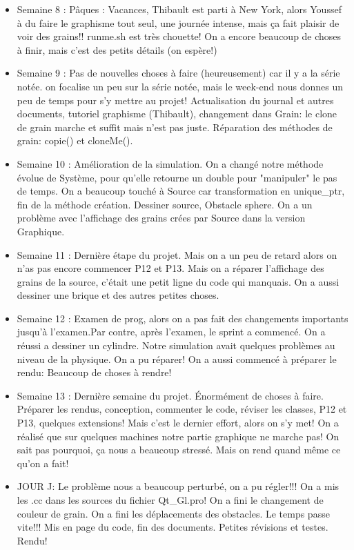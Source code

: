 \documentclass[a4paper,10pt]{article}
\begin{document}
\begin{itemize}
 \item Semaine 8 : Pâques : Vacances, Thibault est parti à New York, alors Youssef à du faire le graphisme tout seul, une journée intense, mais ça fait plaisir de voir des grains!! runme.sh est très chouette! On a encore beaucoup de choses à finir, mais c'est des petits détails (on espère!)
 
 \item Semaine 9 : Pas de nouvelles choses à faire (heureusement) car il y a la série notée. on focalise un peu sur la série notée, mais le week-end nous donnes un peu de temps pour s'y mettre au projet! Actualisation du journal et autres documents, tutoriel graphisme (Thibault), changement dans Grain: le clone de grain marche et suffit mais n'est pas juste. Réparation des méthodes de grain: copie() et cloneMe().
 
 \item Semaine 10 : Amélioration de la simulation. On a changé notre méthode évolue de Système, pour qu'elle retourne un double pour "manipuler" le pas de temps. On a beaucoup touché à Source car transformation en unique\_ptr, fin de la méthode création. Dessiner source, Obstacle sphere. On a un problème avec l'affichage des grains crées par Source dans la version Graphique.
 
 \item Semaine 11 : Dernière étape du projet. Mais on a un peu de retard alors on n'as pas encore commencer P12 et P13. Mais on a réparer l’affichage des grains de la source, c'était une petit ligne du code qui manquais. On a aussi dessiner une brique et des autres petites choses.
 
 \item Semaine 12 : Examen de prog, alors on a pas fait des changements importants jusqu'à l'examen.Par contre, après l'examen, le sprint a commencé. On a réussi a dessiner un cylindre. Notre simulation avait quelques problèmes au niveau de la physique. On a pu réparer! On a aussi commencé à préparer le rendu: Beaucoup de choses à rendre!

 \item Semaine 13 : Dernière semaine du projet. Énormément de choses à faire. Préparer les rendus, conception, commenter le code, réviser les classes, P12 et P13, quelques extensions! Mais c'est le dernier effort, alors on s'y met! On a réalisé que sur quelques machines notre partie graphique ne marche pas! On sait pas pourquoi, ça nous a beaucoup stressé. Mais on rend quand même ce qu'on a fait!
 
 \item JOUR J: Le problème nous a beaucoup perturbé, on a pu régler!!! On a mis les .cc dans les sources du fichier Qt\_Gl.pro! On a fini le changement de couleur de grain. On a fini les déplacements des obstacles. Le temps passe vite!!! Mis en page du code, fin des documents. Petites révisions et testes. Rendu!
 
 
 
 
\end{itemize}
\end{document}
